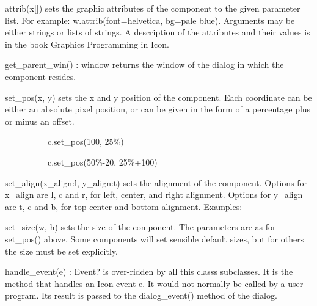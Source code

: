 attrib(x[]) sets the graphic attributes of the component to the given
parameter list. For example:
w.attrib({\textquotedbl}font=helvetica{\textquotedbl},
{\textquotedbl}bg=pale blue{\textquotedbl}). Arguments may be either
strings or lists of strings. A description of the attributes and their
values is in the book {\textquotedbl}Graphics Programming in
Icon{\textquotedbl}.

get\_parent\_win() : window returns the window of the dialog in which
the component resides.

set\_pos(x, y) sets the x and y position of the component. Each
coordinate can be either an absolute pixel position, or can be given in
the form of a percentage plus or minus an offset.

{\sffamily
\ \ \ \ \ \ \ \ \ \ c.set\_pos(100, {\textquotedbl}25\%{\textquotedbl})}

{\sffamily
\ \ \ \ \ \ \ \ \ \ c.set\_pos({\textquotedbl}50\%-20{\textquotedbl},
{\textquotedbl}25\%+100{\textquotedbl})}

set\_align(x\_align:{\textquotedbl}l{\textquotedbl},
y\_align:{\textquotedbl}t{\textquotedbl}) sets the alignment of the
component. Options for x\_align are {\textquotedbl}l{\textquotedbl},
{\textquotedbl}c{\textquotedbl} and {\textquotedbl}r{\textquotedbl},
for left, center, and right alignment. Options for y\_align are
{\textquotedbl}t{\textquotedbl}, {\textquotedbl}c{\textquotedbl} and
{\textquotedbl}b{\textquotedbl}, for top center and bottom alignment.
Examples:


set\_size(w, h) sets the size of the component. The parameters are as
for set\_pos() above. Some components will set sensible default sizes,
but for others the size must be set explicitly.

handle\_event(e) : Event? is over-ridden by all this
class{\textquotesingle}s subclasses. It is the method that handles an
Icon event e. It would not normally be called by a user program. Its
result is passed to the dialog\_event() method of the dialog.


